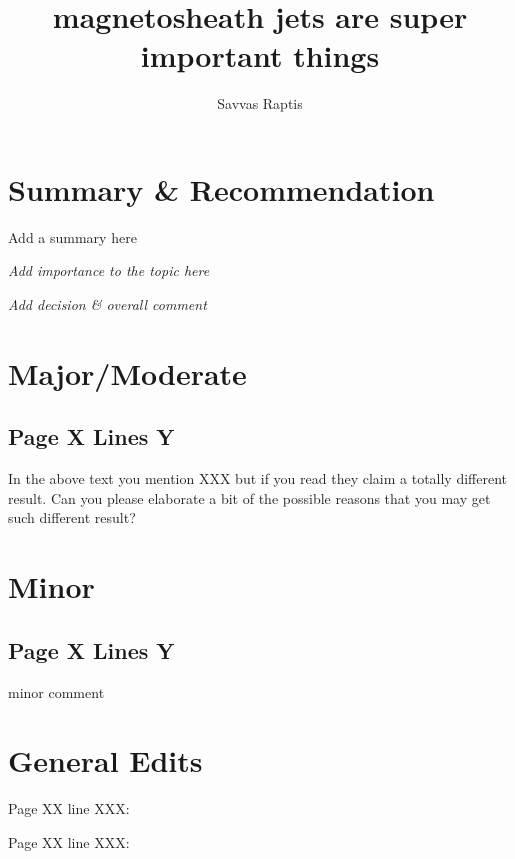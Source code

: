 \documentclass{rc2ms}
\title{magnetosheath jets are super important things}
\author{Savvas Raptis} %
\begin{document}
\maketitle

\section{Summary \& Recommendation}
\RC Add a summary here

\textit{Add importance to the topic here}

\textit{Add decision \& overall comment}

\section{Major/Moderate}

\subsection{Page X Lines Y}

\begin{quotedtext}
\end{quotedtext}

\RC In the above text you mention XXX but if you read  \cite{vuorinen2019jets,10.3389/fspas.2020.00024} they claim a totally different result. Can you please elaborate a bit of the possible reasons that you may get such different result? 

\section{Minor}

\subsection{Page X Lines Y}

\RC minor comment

\section{General Edits}

Page XX line XXX: 

Page XX line XXX: 


\end{document}

